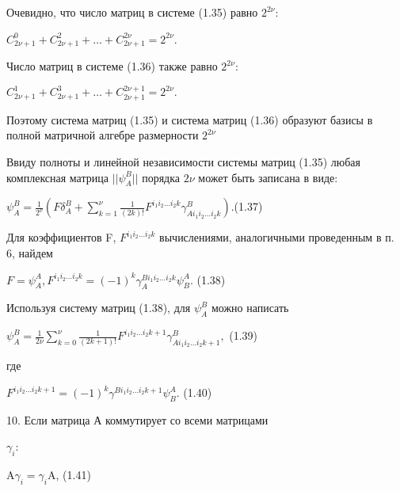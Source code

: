 \documentclass{article}
\begin{document}
{Очевидно, что число матриц в системе (1.35) равно $2^{2\nu}$:\par
\begin{center}
$C^{0}_{2\nu+1}+C^{2}_{2\nu+1}+\dots +C^{2\nu}_{2\nu+1}=2^{2\nu}$.\par
\end{center}
Число матриц в системе (1.36) также равно $2^{2\nu}$:\par
\begin{center}
$C^{1}_{2\nu+1}+C^{3}_{2\nu+1}+ \dots +C^{2\nu+1}_{2\nu+1}=2^{2\nu}.$ \par
\end{center}
Поэтому система матриц (1.35) и система матриц (1.36) образуют базисы в полной матричной алгебре размерности $2^{2\nu}$ \par
Ввиду полноты и линейной независимости системы матриц (1.35) любая комплексная матрица $||\psi^{B}_{A}||$ порядка $2\nu$ может быть записана в виде: \par
$\psi^{B}_{A}=\frac{1}{2^{\nu}}(F\delta^{B}_{A}+\sum_{k=1}^{\nu}\frac{1}{(2k)!}F^{i_1 i_2 \dots i_2k}\gamma^{B}_{Ai_1 i_2 \dots i_2k}).$(1.37)\par
Для коэффициентов F, $F^{i_1 i_2 \dots i_2k}$ вычислениями, аналогичными проведенным в п. 6, найдем \par
\begin{center}
$F=\psi^{A}_{A}, F^{i_1 i_2 \dots i_2k}=(-1)^{k}\gamma^{Bi_1 i_2 \dots i_2k}_{A}\psi^{A}_{B}.$     (1.38)\par
\end{center}
Используя систему матриц (1.38), для $\psi^{B}_{A}$ можно написать\par
\begin{center}
$\psi^{B}_{A}=\frac{1}{2\nu}\sum_{k=0}^{\nu}\frac{1}{(2k+1)!}F^{i_1 i_2 \dots i_2k+1}\gamma^{B}_{Ai_1 i_2 \dots i_2k+1},$     (1.39) \par
\end{center}
где\par
\begin{center}
$F^{i_1 i_2 \dots i_2k+1}=(-1)^{k}\gamma^{Bi_1 i_2 \dots i_2k+1}\psi^{A}_{B}.$ (1.40)\par
\end{center}
10. Если матрица А коммутирует со всеми матрицами \par
$\gamma_i$:\par
\begin{center}
A$\gamma_{i}=\gamma_{i}$A, (1.41) \par
\end{center}
}
\end{document}
